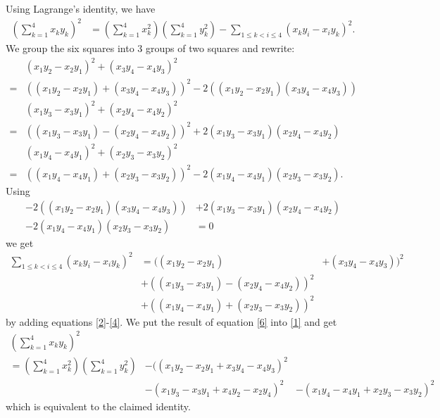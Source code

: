 \documentclass[12pt]{article}
\begin{document}
Using Lagrange's identity, we have
\begin{eqnarray}
\label{1}
\left(\sum_{k=1}^4 x_ky_k\right)^2 & = \left(\sum_{k=1}^4
x_k^2\right)\left(\sum_{k=1}^4 y_k^2\right) -\sum_{1 \le k < i \le 4} (x_ky_i
-x_iy_k)^2\mbox{.}
\end{eqnarray}
We group the six squares into 3 groups of two squares and rewrite:
\begin{eqnarray}
\label{2}
&(x_1y_2 -x_2y_1)^2 +(x_3y_4 -x_4y_3)^2  \\ \nonumber
= &((x_1y_2 -x_2y_1) +(x_3y_4 -x_4y_3))^2  -2((x_1y_2 -x_2y_1)(x_3y_4 -x_4y_3)) \\
\label{3}
&(x_1y_3 -x_3y_1)^2 +(x_2y_4 -x_4y_2)^2 \\  \nonumber
 =& ((x_1y_3 -x_3y_1) -(x_2y_4
-x_4y_2))^2 +2(x_1y_3 -x_3y_1)(x_2y_4 -x_4y_2) \\
\label{4}
&(x_1y_4 -x_4y_1)^2 +(x_2y_3 -x_3y_2)^2\\
 =& ((x_1y_4 -x_4y_1) +(x_2y_3
-x_3y_2))^2
-2(x_1y_4 -x_4y_1)(x_2y_3 -x_3y_2)\mbox{.}
\end{eqnarray}
Using
\begin{eqnarray}
\label{5}
-2((x_1y_2 -x_2y_1)(x_3y_4 -x_4y_3))
&+2(x_1y_3 -x_3y_1)(x_2y_4 -x_4y_2) \\
\nonumber
-2(x_1y_4 -x_4y_1)(x_2y_3 -x_3y_2)& =0
\end{eqnarray}
we get
\begin{eqnarray}
\label{6}
\sum_{1 \le k < i \le 4} (x_ky_i -x_iy_k)^2 & = ((x_1y_2 -x_2y_1) & +(x_3y_4
-x_4y_3))^2 \\
&+((x_1y_3 -x_3y_1) -(x_2y_4
-x_4y_2))^2 \\ \nonumber
&+((x_1y_4 -x_4y_1) +(x_2y_3
-x_3y_2))^2
\end{eqnarray}
by adding equations \ref{2}-\ref{4}. We put the result of equation \ref{6} into
\ref{1} and get
\begin{eqnarray}
\left(\sum_{k=1}^4 x_ky_k\right)^2 \\
\nonumber  =\left(\sum_{k=1}^4
x_k^2\right)\left(\sum_{k=1}^4 y_k^2\right) &-( (x_1y_2 -x_2y_1 +x_3y_4
-x_4y_3)^2 \\ \nonumber
&-(x_1y_3 -x_3y_1 +x_4y_2 -x_2y_4
)^2 & -(x_1y_4 -x_4y_1 +x_2y_3
-x_3y_2)^2
\end{eqnarray}
which is equivalent to the claimed identity.
\end{document}
